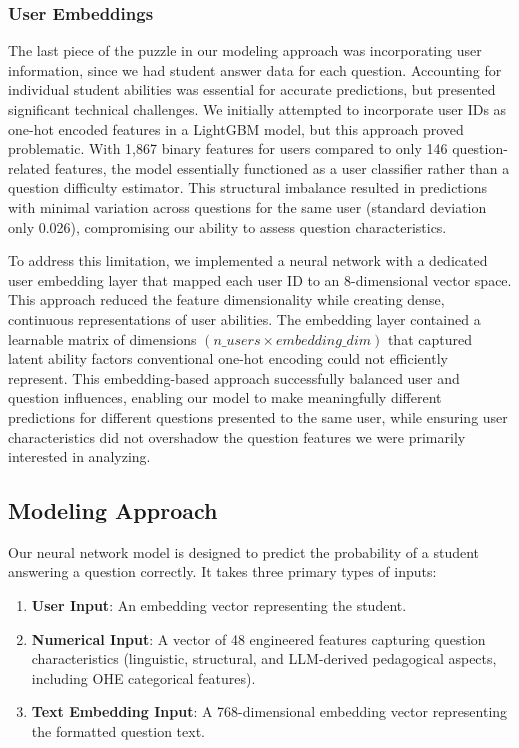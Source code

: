 \documentclass[
    a4paper, %
    10pt, %
    twoside, %
]{LTJournalArticle}
\begin{document}
\subsubsection{User Embeddings}

The last piece of the puzzle in our modeling approach was incorporating user information, since we had student answer data for each question. Accounting for individual student abilities was essential for accurate predictions, but presented significant technical challenges. We initially attempted to incorporate user IDs as one-hot encoded features in a LightGBM model, but this approach proved problematic. With 1,867 binary features for users compared to only 146 question-related features, the model essentially functioned as a user classifier rather than a question difficulty estimator. This structural imbalance resulted in predictions with minimal variation across questions for the same user (standard deviation only 0.026), compromising our ability to assess question characteristics.

To address this limitation, we implemented a neural network with a dedicated user embedding layer that mapped each user ID to an 8-dimensional vector space. This approach reduced the feature dimensionality while creating dense, continuous representations of user abilities. The embedding layer contained a learnable matrix of dimensions $(n\_users \times embedding\_dim)$ that captured latent ability factors conventional one-hot encoding could not efficiently represent. This embedding-based approach successfully balanced user and question influences, enabling our model to make meaningfully different predictions for different questions presented to the same user, while ensuring user characteristics did not overshadow the question features we were primarily interested in analyzing.

\subsection{Modeling Approach}

Our neural network model is designed to predict the probability of a student answering a question correctly. It takes three primary types of inputs:
\begin{enumerate}
    \item \textbf{User Input}: An embedding vector representing the student.
    \item \textbf{Numerical Input}: A vector of 48 engineered features capturing question characteristics (linguistic, structural, and LLM-derived pedagogical aspects, including OHE categorical features).
    \item \textbf{Text Embedding Input}: A 768-dimensional embedding vector representing the formatted question text.
\end{enumerate}
\end{document}

